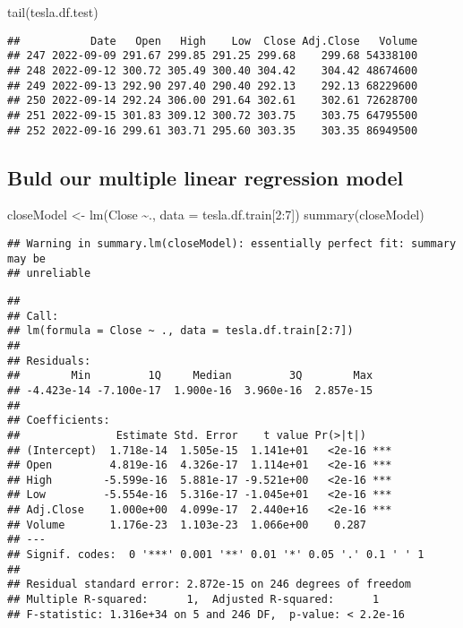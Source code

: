 \documentclass[
]{article}
\newenvironment{Shaded}{\begin{snugshade}}{\end{snugshade}}
\newcommand{\AttributeTok}[1]{\textcolor[rgb]{0.77,0.63,0.00}{#1}}
\newcommand{\DecValTok}[1]{\textcolor[rgb]{0.00,0.00,0.81}{#1}}
\newcommand{\FunctionTok}[1]{\textcolor[rgb]{0.00,0.00,0.00}{#1}}
\newcommand{\NormalTok}[1]{#1}
\newcommand{\OtherTok}[1]{\textcolor[rgb]{0.56,0.35,0.01}{#1}}
\newcommand{\SpecialCharTok}[1]{\textcolor[rgb]{0.00,0.00,0.00}{#1}}
\begin{document}
\begin{Shaded}
\begin{Highlighting}[]
\FunctionTok{tail}\NormalTok{(tesla.df.test)}
\end{Highlighting}
\end{Shaded}

\begin{verbatim}
##           Date   Open   High    Low  Close Adj.Close   Volume
## 247 2022-09-09 291.67 299.85 291.25 299.68    299.68 54338100
## 248 2022-09-12 300.72 305.49 300.40 304.42    304.42 48674600
## 249 2022-09-13 292.90 297.40 290.40 292.13    292.13 68229600
## 250 2022-09-14 292.24 306.00 291.64 302.61    302.61 72628700
## 251 2022-09-15 301.83 309.12 300.72 303.75    303.75 64795500
## 252 2022-09-16 299.61 303.71 295.60 303.35    303.35 86949500
\end{verbatim}

\hypertarget{buld-our-multiple-linear-regression-model}{%
\subsection{Buld our multiple linear regression
model}\label{buld-our-multiple-linear-regression-model}}

\begin{Shaded}
\begin{Highlighting}[]
\NormalTok{closeModel }\OtherTok{\textless{}{-}} \FunctionTok{lm}\NormalTok{(Close }\SpecialCharTok{\textasciitilde{}}\NormalTok{., }\AttributeTok{data =}\NormalTok{ tesla.df.train[}\DecValTok{2}\SpecialCharTok{:}\DecValTok{7}\NormalTok{])}
\FunctionTok{summary}\NormalTok{(closeModel)}
\end{Highlighting}
\end{Shaded}

\begin{verbatim}
## Warning in summary.lm(closeModel): essentially perfect fit: summary may be
## unreliable
\end{verbatim}

\begin{verbatim}
## 
## Call:
## lm(formula = Close ~ ., data = tesla.df.train[2:7])
## 
## Residuals:
##        Min         1Q     Median         3Q        Max 
## -4.423e-14 -7.100e-17  1.900e-16  3.960e-16  2.857e-15 
## 
## Coefficients:
##               Estimate Std. Error    t value Pr(>|t|)    
## (Intercept)  1.718e-14  1.505e-15  1.141e+01   <2e-16 ***
## Open         4.819e-16  4.326e-17  1.114e+01   <2e-16 ***
## High        -5.599e-16  5.881e-17 -9.521e+00   <2e-16 ***
## Low         -5.554e-16  5.316e-17 -1.045e+01   <2e-16 ***
## Adj.Close    1.000e+00  4.099e-17  2.440e+16   <2e-16 ***
## Volume       1.176e-23  1.103e-23  1.066e+00    0.287    
## ---
## Signif. codes:  0 '***' 0.001 '**' 0.01 '*' 0.05 '.' 0.1 ' ' 1
## 
## Residual standard error: 2.872e-15 on 246 degrees of freedom
## Multiple R-squared:      1,  Adjusted R-squared:      1 
## F-statistic: 1.316e+34 on 5 and 246 DF,  p-value: < 2.2e-16
\end{verbatim}
\end{document}
